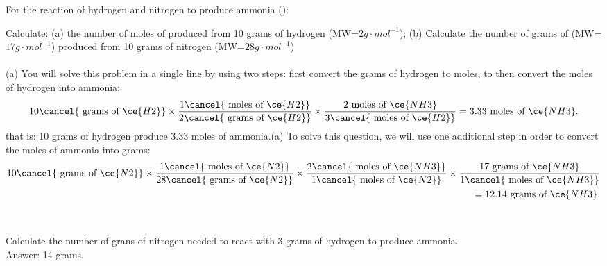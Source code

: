 \documentclass[main.tex]{subfiles}
\begin{document}
\begin{description}
\begin{example} %
For the reaction of hydrogen and nitrogen to produce ammonia ():
\begin{center} \end{center}
Calculate: (a) the number of moles of   produced from 10 grams of hydrogen (MW=$2g\cdot mol^{-1}$); (b) Calculate the number of grams of  (MW=$17g\cdot mol^{-1}$) produced from 10 grams of nitrogen (MW=$28g\cdot mol^{-1}$) \\
\\
(a) You will solve this problem in a single line by using two steps: first convert the grams of hydrogen to moles, to then convert the moles of hydrogen into ammonia:
\begin{equation*}
10\cancel{\text{ grams of }\ce{H2}}   \times  \dfrac{1\cancel{\text{ moles of }\ce{H2}}}{2\cancel{\text{ grams of }\ce{H2}}}
 \times \dfrac{\text{2 moles of }\ce{NH3}}{3\cancel{\text{ moles of }\ce{H2}}}=3.33\text{ moles of }\ce{NH3}.
\end{equation*}
that is: 10 grams of hydrogen produce 3.33 moles of ammonia.(a) To solve this question, we will use one additional step in order to convert the moles of ammonia into grams:
\begin{equation*}\begin{split}
10\cancel{\text{ grams of }\ce{N2}}   \times  \dfrac{1\cancel{\text{ moles of }\ce{N2}}}{28\cancel{\text{ grams of }\ce{N2}}}
 \times \dfrac{2\cancel{\text{ moles of }\ce{NH3}}}{1\cancel{\text{ moles of }\ce{N2}}}
  \times  \dfrac{17\text{ grams of }\ce{NH3}}{1\cancel{\text{ moles of }\ce{NH3}}}\\
 =12.14\text{ grams of }\ce{NH3}.
\end{split}\end{equation*}
\\
\faDiamond\ \\
Calculate the number of grans of nitrogen needed to react with 3 grams of hydrogen to produce ammonia. \\
\flushright Answer: 14 grams.
\end{example}%

\end{description}
\end{document}
